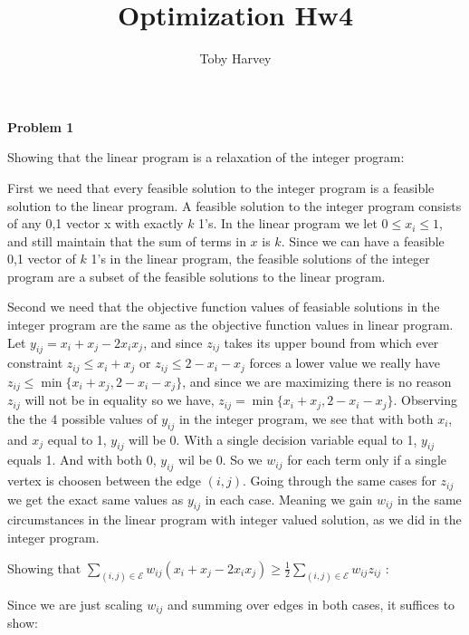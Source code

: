 \documentclass{article}
\begin{document}
\title{Optimization Hw4}
\author{Toby Harvey}
\maketitle
\noindent\textbf{Problem 1}

\noindent Showing that the linear program is a relaxation of the integer program:

First we need that every feasible solution to the integer program is a feasible solution to the linear program. A feasible solution to the integer program consists of any 0,1 vector x with exactly $k$ 1's. In the linear program we let $0 \leq x_i \leq 1$, and still maintain that the sum of terms in $x$ is $k$. Since we can have a feasible 0,1 vector of $k$ 1's in the linear program, the feasible solutions of the integer program are a subset of the feasible solutions to the linear program.

Second we need that the objective function values of feasiable solutions in the integer program are the same as the objective function values in linear program. Let $y_{ij} = x_i + x_j - 2x_ix_j$, and since $z_{ij}$ takes its upper bound from which ever constraint $z_{ij} \leq x_i + x_j$ or $z_{ij} \leq 2 - x_i - x_j$ forces a lower value we really have $z_{ij} \leq \min\{x_i+ x_j, 2 - x_i - x_j \}$, and since we are maximizing there is no reason $z_{ij}$ will not be in equality so we have, $z_{ij} = \min\{x_i + x_j, 2 - x_i - x_j\}$. Observing the the 4 possible values of $y_{ij}$ in the integer program, we see that with both $x_i$, and $x_j$ equal to 1, $y_{ij}$ will be 0. With a single decision variable equal to 1, $y_{ij}$ equals 1. And with both 0, $y_{ij}$ wil be 0. So we $w_{ij}$ for each term only if a single vertex is choosen between the edge $(i,j)$. Going through the same cases for $z_{ij}$ we get the exact same values as $y_{ij}$ in each case. Meaning we gain $w_{ij}$ in the same circumstances in the linear program with integer valued solution, as we did in the integer program.

\vspace{5mm}

\noindent Showing that $\sum_{(i,j) \in \mathcal{E}} w_{ij}(x_i + x_j - 2x_ix_j) \geq \frac{1}{2} \sum_{(i,j) \in \mathcal{E}} w_{ij}z_{ij}$ : 

\vspace{3mm}

Since we are just scaling $w_{ij}$ and summing over edges in both cases, it suffices to show:
\end{document}
